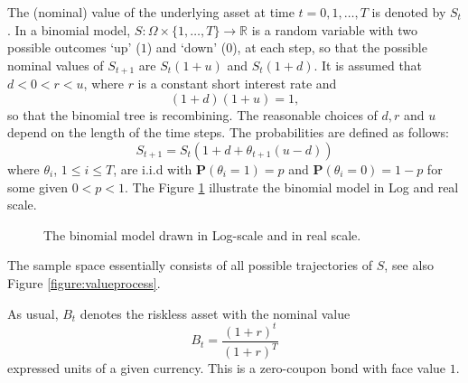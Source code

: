 \documentclass{amsart}
\theoremstyle{definition}
\theoremstyle{remark}
\numberwithin{equation}{section}
\newcommand{\R}{\mathbb{R}}
\renewcommand{\P}{\mathbf{P}}
\newcommand{\1}{\boldsymbol{1}}
\begin{document}
The (nominal) value of the underlying asset at time $t=0,1,\ldots , T$ is denoted by $S_t$. 
In a binomial model, $S:\Omega\times\{1,\ldots,T\} \to \R$ is a random variable with two possible outcomes `up' ($1$) and `down' ($0$), at each step, so that the possible nominal values of $S_{t+1}$ are $S_t (1+u)$ and $S_t (1+d)$. It is assumed that $d<0<r<u$, where $r$ is a constant short interest rate and 
\[(1+d)(1+u)=1,\]
so that the binomial tree is recombining. 
The reasonable choices of $d,r$ and $u$ depend on the length of the time steps. The probabilities are defined as follows:
\[S_{t+1} = S_t (1+d+\theta_{t+1}(u-d))\]
where $\theta_i$, $1\leq i\leq T$, are i.i.d with $\P(\theta_i =1)=p$ and  $\P(\theta_i =0)=1-p$ for some given $0<p<1$. The Figure \ref{Figure:Binomialmodel}  illustrate the binomial model in Log and real scale.


{
\centering
\begin{figure}[h!!]
     \centering
     \caption{The binomial model drawn in Log-scale and in real scale.}
     \label{Figure:Binomialmodel}

\end{figure}
}


The sample space essentially consists of all possible trajectories of $S$, see also Figure \ref{figure:valueprocess}.




As usual, $B_t$ denotes the riskless asset with the nominal value
\[B_t = \frac{(1+r)^{t}}{(1+r)^{T}}\]
expressed units of a given currency. This is a zero-coupon bond with face value $1$. 
\end{document}
